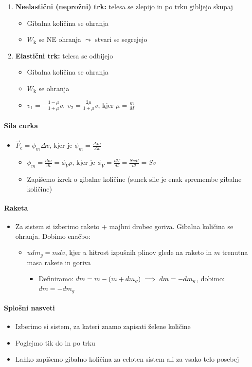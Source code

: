 \begin{enumerate}
    \item \textbf{Neelastični (neprožni) trk:} telesa se zlepijo in po trku gibljejo skupaj
    \begin{itemize}
        \item Gibalna količina se ohranja
        \item \(W_\text{k}\) se NE ohranja \(\leadsto\) stvari se segrejejo 
    \end{itemize}
    \item \textbf{Elastični trk:} telesa se odbijejo
    \begin{itemize}
        \item Gibalna količina se ohranja
        \item \(W_\text{k}\) se ohranja
        \item \(\boxed{v_1 = - \frac{1 - \mu}{1 + \mu} v, \ v_2 = \frac{2 \mu}{1 + \mu} v}\), kjer \(\mu = \frac{m}{M}\)
    \end{itemize}
\end{enumerate}

\paragraph{Sila curka}
\begin{itemize}
    \item \(\vec{F}_\text{c} = \phi_m \Delta v\), kjer je \(\phi_m = \frac{\Delta m}{\Delta t}\) 
    \begin{itemize}
        \item \(\phi_m = \frac{dm}{dt} = \phi_V \rho\), kjer je \(\phi_V = \frac{dV}{dt} = \frac{Svdt}{dt} = Sv\) 
        \item Zapišemo izrek o gibalne količine (sunek sile je enak spremembe gibalne količine)
    \end{itemize}
\end{itemize}

\paragraph{Raketa} 
\begin{itemize}
    \item Za sistem si izberimo raketo + majhni drobec goriva. Gibalna količina se ohranja. Dobimo enačbo:
    \begin{itemize}
        \item \(u dm_g = mdv\), kjer \(u\) hitrost izpušnih plinov glede na raketo in \(m\) trenutna masa rakete in goriva
        \begin{itemize}
            \item Definiramo: \(dm = m - (m + dm_g) \implies dm = -dm_g\), dobimo: \(dm = -dm_g\)
        \end{itemize}
    \end{itemize}
\end{itemize}


\paragraph{Splošni nasveti}
\begin{itemize}
    \item Izberimo si sistem, za kateri znamo zapisati želene količine
    \item Poglejmo tik do in po trku
    \item Lahko zapišemo gibalno količina za celoten sistem ali za vsako telo posebej
\end{itemize}